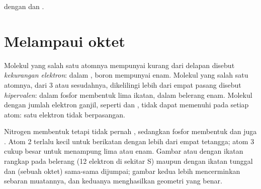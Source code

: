 \begin{omfigure}

{\small {} dengan  dan .}
\end{omfigure}

\section{Melampaui oktet}

\begin{definition}\label{def:b1:lewis-resonance-vsepr:hypervalent}
Molekul yang salah satu atomnya mempunyai kurang dari delapan  disebut \emph{kekurangan elektron}:
dalam , boron mempunyai enam. Molekul yang salah satu atomnya,
dari  3 atau sesudahnya, dikelilingi lebih dari empat pasang
disebut \emph{hipervalen}: dalam  fosfor
membentuk lima ikatan, dalam  belerang enam. Molekul dengan
jumlah elektron ganjil, seperti  dan , tidak dapat
memenuhi  pada setiap atom: satu elektron tidak
berpasangan.
\end{definition}

\begin{remark}\label{rem:b1:lewis-resonance-vsepr:hypervalent}
Nitrogen membentuk  tetapi tidak pernah , sedangkan fosfor
membentuk  dan juga . Atom  2 terlalu kecil untuk
berikatan dengan lebih dari empat tetangga; atom  3 cukup besar
untuk menampung lima atau enam. Gambar  atau 
dengan ikatan rangkap pada belerang (12 elektron di sekitar S) maupun
dengan ikatan tunggal dan  (sebuah oktet) sama-sama
dijumpai; gambar kedua lebih mencerminkan sebaran muatannya, dan
keduanya menghasilkan geometri yang benar.
\end{remark}

